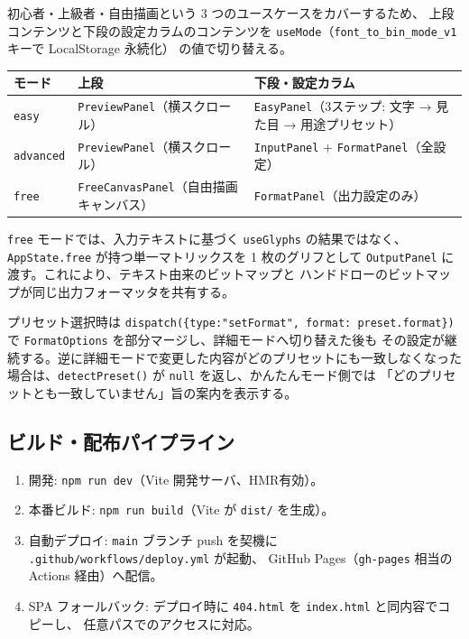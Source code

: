 初心者・上級者・自由描画という 3 つのユースケースをカバーするため、
上段コンテンツと下段の設定カラムのコンテンツを
\texttt{useMode}（\texttt{font\_to\_bin\_mode\_v1} キーで LocalStorage 永続化）
の値で切り替える。

\begin{tabularx}{\textwidth}{l X X}
\toprule
\textbf{モード} & \textbf{上段} & \textbf{下段・設定カラム} \\
\midrule
\texttt{easy} & \texttt{PreviewPanel}（横スクロール） & \texttt{EasyPanel}（3ステップ: 文字 → 見た目 → 用途プリセット）\\
\texttt{advanced} & \texttt{PreviewPanel}（横スクロール） & \texttt{InputPanel} + \texttt{FormatPanel}（全設定）\\
\texttt{free} & \texttt{FreeCanvasPanel}（自由描画キャンバス） & \texttt{FormatPanel}（出力設定のみ）\\
\bottomrule
\end{tabularx}

\vspace{2mm}

\texttt{free} モードでは、入力テキストに基づく \texttt{useGlyphs} の結果ではなく、
\texttt{AppState.free} が持つ単一マトリックスを 1 枚のグリフとして
\texttt{OutputPanel} に渡す。これにより、テキスト由来のビットマップと
ハンドドローのビットマップが同じ出力フォーマッタを共有する。

\vspace{2mm}

プリセット選択時は \texttt{dispatch(\{type:"setFormat", format: preset.format\})}
で \texttt{FormatOptions} を部分マージし、詳細モードへ切り替えた後も
その設定が継続する。逆に詳細モードで変更した内容がどのプリセットにも一致しなくなった
場合は、\texttt{detectPreset()} が \texttt{null} を返し、かんたんモード側では
「どのプリセットとも一致していません」旨の案内を表示する。

\subsection{ビルド・配布パイプライン}

\begin{enumerate}[leftmargin=*,itemsep=2pt]
  \item 開発: \texttt{npm run dev}（Vite 開発サーバ、HMR有効）。
  \item 本番ビルド: \texttt{npm run build}（Vite が \texttt{dist/} を生成）。
  \item 自動デプロイ: \texttt{main} ブランチ push を契機に
        \texttt{.github/workflows/deploy.yml} が起動、
        GitHub Pages（\texttt{gh-pages} 相当の Actions 経由）へ配信。
  \item SPA フォールバック: デプロイ時に \texttt{404.html} を
        \texttt{index.html} と同内容でコピーし、
        任意パスでのアクセスに対応。
\end{enumerate}

\newpage
